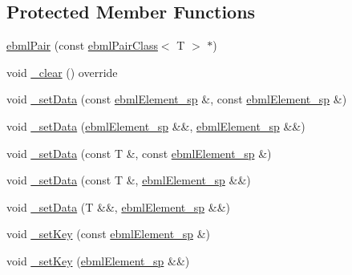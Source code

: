 \subsection*{Protected Member Functions}
\begin{DoxyCompactItemize}
\item 
\mbox{\hyperlink{classebml_1_1ebmlPair_a5dadd29820eb5bca6f5bda996f70f06f}{ebml\+Pair}} (const \mbox{\hyperlink{classebml_1_1ebmlPairClass}{ebml\+Pair\+Class}}$<$ T $>$ $\ast$)
\item 
void \mbox{\hyperlink{classebml_1_1ebmlPair_a521c8592475793acf050353ddf56031c}{\+\_\+clear}} () override
\item 
void \mbox{\hyperlink{classebml_1_1ebmlPair_a43ae0c4a471cba5b3c83133951b773ba}{\+\_\+set\+Data}} (const \mbox{\hyperlink{namespaceebml_adad533b7705a16bb360fe56380c5e7be}{ebml\+Element\+\_\+sp}} \&, const \mbox{\hyperlink{namespaceebml_adad533b7705a16bb360fe56380c5e7be}{ebml\+Element\+\_\+sp}} \&)
\item 
void \mbox{\hyperlink{classebml_1_1ebmlPair_af03a41878253632d58c0af0a5121a411}{\+\_\+set\+Data}} (\mbox{\hyperlink{namespaceebml_adad533b7705a16bb360fe56380c5e7be}{ebml\+Element\+\_\+sp}} \&\&, \mbox{\hyperlink{namespaceebml_adad533b7705a16bb360fe56380c5e7be}{ebml\+Element\+\_\+sp}} \&\&)
\item 
void \mbox{\hyperlink{classebml_1_1ebmlPair_a1da4edfcf6f4709e7a33017a3f93dc29}{\+\_\+set\+Data}} (const T \&, const \mbox{\hyperlink{namespaceebml_adad533b7705a16bb360fe56380c5e7be}{ebml\+Element\+\_\+sp}} \&)
\item 
void \mbox{\hyperlink{classebml_1_1ebmlPair_a3cc1fdcae7b1f0b39998735b2802e91e}{\+\_\+set\+Data}} (const T \&, \mbox{\hyperlink{namespaceebml_adad533b7705a16bb360fe56380c5e7be}{ebml\+Element\+\_\+sp}} \&\&)
\item 
void \mbox{\hyperlink{classebml_1_1ebmlPair_acba0d25b5f3882ad2c80bbbb2f135336}{\+\_\+set\+Data}} (T \&\&, \mbox{\hyperlink{namespaceebml_adad533b7705a16bb360fe56380c5e7be}{ebml\+Element\+\_\+sp}} \&\&)
\item 
void \mbox{\hyperlink{classebml_1_1ebmlPair_a6974cf70949c7e2a53754b7fb71d8a72}{\+\_\+set\+Key}} (const \mbox{\hyperlink{namespaceebml_adad533b7705a16bb360fe56380c5e7be}{ebml\+Element\+\_\+sp}} \&)
\item 
void \mbox{\hyperlink{classebml_1_1ebmlPair_a322d953e0ec4e42cb630aa2f1b97dc75}{\+\_\+set\+Key}} (\mbox{\hyperlink{namespaceebml_adad533b7705a16bb360fe56380c5e7be}{ebml\+Element\+\_\+sp}} \&\&)
\item 

\end{DoxyCompactItemize}
